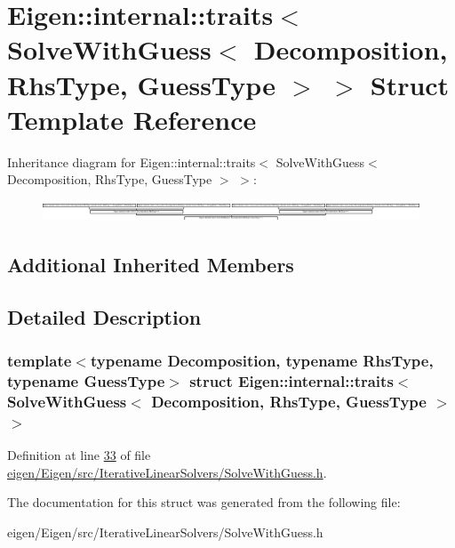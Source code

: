 \hypertarget{struct_eigen_1_1internal_1_1traits_3_01_solve_with_guess_3_01_decomposition_00_01_rhs_type_00_01_guess_type_01_4_01_4}{}\section{Eigen\+:\+:internal\+:\+:traits$<$ Solve\+With\+Guess$<$ Decomposition, Rhs\+Type, Guess\+Type $>$ $>$ Struct Template Reference}
\label{struct_eigen_1_1internal_1_1traits_3_01_solve_with_guess_3_01_decomposition_00_01_rhs_type_00_01_guess_type_01_4_01_4}
Inheritance diagram for Eigen\+:\+:internal\+:\+:traits$<$ Solve\+With\+Guess$<$ Decomposition, Rhs\+Type, Guess\+Type $>$ $>$\+:\begin{figure}[H]
\begin{center}
\leavevmode
\includegraphics[height=0.610465cm]{struct_eigen_1_1internal_1_1traits_3_01_solve_with_guess_3_01_decomposition_00_01_rhs_type_00_01_guess_type_01_4_01_4}
\end{center}
\end{figure}
\subsection*{Additional Inherited Members}


\subsection{Detailed Description}
\subsubsection*{template$<$typename Decomposition, typename Rhs\+Type, typename Guess\+Type$>$\newline
struct Eigen\+::internal\+::traits$<$ Solve\+With\+Guess$<$ Decomposition, Rhs\+Type, Guess\+Type $>$ $>$}



Definition at line \hyperlink{eigen_2_eigen_2src_2_iterative_linear_solvers_2_solve_with_guess_8h_source_l00033}{33} of file \hyperlink{eigen_2_eigen_2src_2_iterative_linear_solvers_2_solve_with_guess_8h_source}{eigen/\+Eigen/src/\+Iterative\+Linear\+Solvers/\+Solve\+With\+Guess.\+h}.



The documentation for this struct was generated from the following file\+:\begin{DoxyCompactItemize}
\item 
eigen/\+Eigen/src/\+Iterative\+Linear\+Solvers/\+Solve\+With\+Guess.\+h\end{DoxyCompactItemize}
